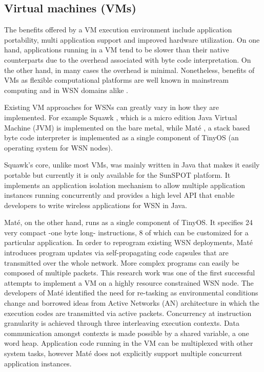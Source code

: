 \subsection{Virtual machines (VMs)}
The benefits offered by a VM execution environment include application portability, multi application support and improved hardware utilization. On one hand, applications running in a VM tend to be slower than their native counterparts due to the overhead associated with byte code interpretation. On the other hand, in many cases the overhead is minimal. Nonetheless, benefits of VMs as flexible computational platforms are well known in mainstream computing\cite{Montero2011750} and in WSN domains alike \cite{Brouwers:2009:DFV:1644038.1644056}.  

Existing VM approaches for WSNs can greatly vary in how they are implemented. For example Squawk \cite{simon2005squawk}, which is a micro edition Java Virtual Machine (JVM) is implemented on the bare metal, while Maté \cite{Levis:2002:MTV:635506.605407}, a stack based byte code interpreter is implemented as a single component of TinyOS \cite{1630599} (an operating system for WSN nodes).

Squawk's core, unlike most VMs, was mainly written in Java that makes it easily portable but currently it is only available for the SunSPOT platform. It implements an application isolation mechanism to allow multiple application instances running concurrently and provides a high level API that enable developers to write wireless applications for WSN in Java.
 
Maté, on the other hand, runs as a single component of TinyOS.  It specifies 24 very compact -one byte long- instructions, 8 of which can be customized for a particular application. In order to reprogram existing WSN deployments, Maté introduces program updates via self-propagating code capsules that are transmitted over the whole network. More complex programs can easily be composed of multiple packets. 
This research work was one of the first successful attempts to implement a VM on a highly resource constrained WSN node. The developers of Maté identified the need for re-tasking as environmental conditions change and borrowed ideas from Active Networks (AN) architecture in which the execution codes are transmitted via active packets. Concurrency at instruction granularity is achieved through three interleaving execution contexts.  Data communication amongst contexts is made possible by a shared variable, a one word heap. Application code running in the VM can be multiplexed with other system tasks, however Maté does not explicitly support multiple concurrent application instances.

